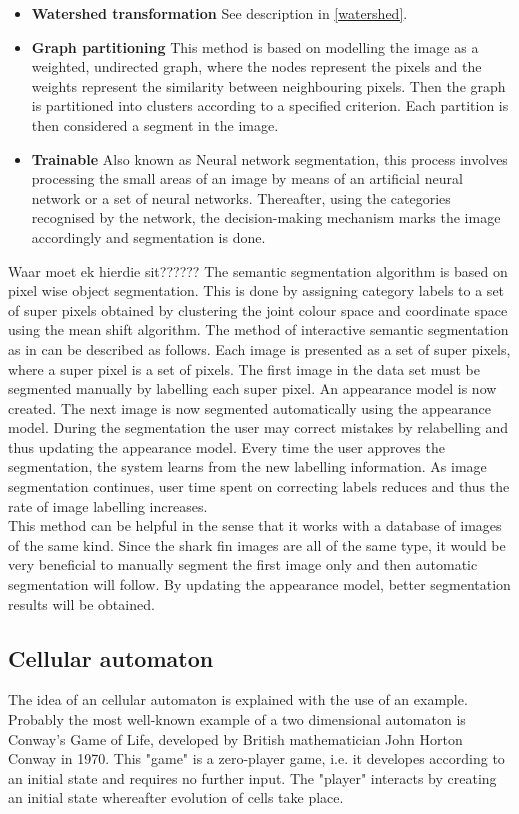 \documentclass[a4paper,10pt]{article}
\begin{document}
\begin{itemize}
 \item \textbf{Watershed transformation} See description in \ref{watershed}.    
 \item \textbf{Graph partitioning}\cite{rw} This method is based on modelling
the image as a weighted, undirected graph, where the nodes represent the pixels
and the weights represent the similarity between neighbouring pixels. Then the
graph is partitioned into clusters according to a specified criterion.  Each
partition is then considered a segment in the image.
 \item \textbf{Trainable}\cite{trainable} Also known as Neural network segmentation,
this process involves processing the small areas of an image by means of an
artificial neural network or a set of neural networks.  Thereafter, using the
categories recognised by the network, the decision-making mechanism marks the
image accordingly and segmentation is done.
\end{itemize}

Waar moet ek hierdie sit??????
The semantic segmentation
algorithm is based on pixel wise object segmentation.  This is done by 
assigning category labels to a set of super pixels obtained by clustering the
joint colour space and coordinate space using the mean shift algorithm.
The method of interactive semantic segmentation as in \cite{RF} can be described
as follows.  Each image is presented as a set of super pixels, where 
a super pixel is a set of pixels.  The first image in the data set must be
segmented manually by labelling each super pixel. An appearance model is 
now created.  The next image is now segmented automatically using the appearance
model.  During the segmentation the user may correct mistakes by 
relabelling and thus updating the appearance model.  Every time the user
approves the segmentation, the system learns from the new labelling information.
As image segmentation continues, user time spent on correcting labels reduces
and thus the rate of image labelling increases. \\

This method can be helpful in the sense that it works with a database of images
of the same kind.  Since the shark fin images are all of the same type, 
it would be very beneficial to manually segment the first image only and then
automatic segmentation will follow.  By updating the appearance model, 
better segmentation results will be obtained.  \\ 

\subsection{Cellular automaton}
\label{ca}
The idea of an cellular automaton is explained with the use of an example.
Probably the most well-known example of a two dimensional automaton is Conway's
Game of Life\cite{gol}, developed by British mathematician John Horton Conway in 1970. 
This "game" is a zero-player game, i.e. it developes according to an initial
state
and requires no further input.  The "player" interacts by creating an initial
state whereafter evolution of cells take place.  \\
\end{document}
